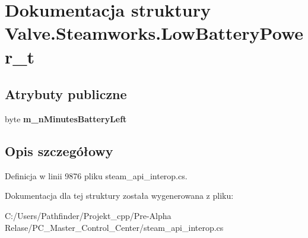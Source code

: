 \hypertarget{struct_valve_1_1_steamworks_1_1_low_battery_power__t}{}\section{Dokumentacja struktury Valve.\+Steamworks.\+Low\+Battery\+Power\+\_\+t}
\label{struct_valve_1_1_steamworks_1_1_low_battery_power__t}
\subsection*{Atrybuty publiczne}
\begin{DoxyCompactItemize}
\item 
\mbox{\label{struct_valve_1_1_steamworks_1_1_low_battery_power__t_a7b92eec92623c5a4a87a1a1e16435636}} 
byte {\bfseries m\+\_\+n\+Minutes\+Battery\+Left}
\end{DoxyCompactItemize}


\subsection{Opis szczegółowy}


Definicja w linii 9876 pliku steam\+\_\+api\+\_\+interop.\+cs.



Dokumentacja dla tej struktury została wygenerowana z pliku\+:\begin{DoxyCompactItemize}
\item 
C\+:/\+Users/\+Pathfinder/\+Projekt\+\_\+cpp/\+Pre-\/\+Alpha Relase/\+P\+C\+\_\+\+Master\+\_\+\+Control\+\_\+\+Center/steam\+\_\+api\+\_\+interop.\+cs\end{DoxyCompactItemize}
